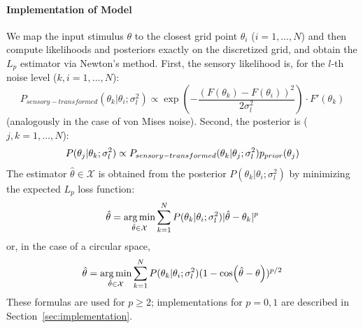 \paragraph*{Implementation of Model}
We map the  input stimulus $\theta$  to the closest grid point $\theta_i$ ($i = 1,\dots, N$) and then compute likelihoods and posteriors exactly 
on the discretized grid, and obtain the $L_p$ estimator via Newton's method.
First, the sensory likelihood is, for the $l$-th noise level ($k, i = 1, \dots, N$):
\begin{equation}
P_{sensory-transformed}(\theta_k|\theta_i; \sigma_l^2) \propto \exp(-\frac{(F(\theta_k) - F(\theta_i))^2}{2\sigma_l^2}) \cdot F'(\theta_k)
\end{equation}
(analogously in the case of von Mises noise).
Second, the posterior is ($j, k = 1, \dots, N$):
\begin{equation}
P(\theta_j|\theta_k; \sigma_l^2) \propto P_{sensory-transformed}(\theta_k|\theta_j; \sigma_l^2) p_{prior}(\theta_j)
\end{equation}
The estimator $\hat{\theta} \in \mathcal{X}$ is obtained from the posterior $P(\theta_k|\theta_i; \sigma_l^2)$ by minimizing the expected $L_p$ loss function:
\begin{equation}\label{eq:lp-estimator-discretized}
\hat{\theta} = \operatorname*{arg\,min}_{\hat{\theta} \in \mathcal{X}} \sum_{k=1}^N P(\theta_k|\theta_i; \sigma_l^2) |\hat{\theta}-\theta_k|^p
\end{equation}
or, in the case of a circular space,
\begin{equation}\label{eq:lp-estimator-discretized-circular}
\hat{\theta} = \operatorname*{arg\,min}_{\hat{\theta} \in \mathcal{X}} \sum_{k=1}^N P(\theta_k|\theta_i; \sigma_l^2) (1-\cos(\hat\theta-\theta))^{p/2}
\end{equation}
These formulas are used for $p \geq 2$; implementations for $p=0,1$ are described in Section~\ref{sec:implementation}. 
%

